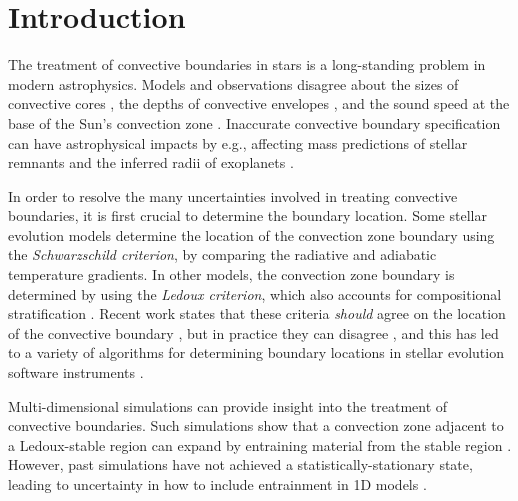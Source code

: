 
\section{Introduction}
\label{sec:introduction}
The treatment of convective boundaries in stars is a long-standing problem in modern astrophysics.
Models and observations disagree about the sizes of convective cores \citep{claret_torres_2018, joyce_chaboyer_2018b, viani_basu_2020, pedersen_etal_2021, johnston_2021}, the depths of convective envelopes \citep[inferred from lithium abundances;][]{pinsonneault_1997, sestito_randich_2005, carlos_etal_2019, dumont_etal_2021}, and the sound speed at the base of the Sun's convection zone \citep[see][Sec.~7.2.1]{basu_2016}.
Inaccurate convective boundary specification can have astrophysical impacts by e.g., affecting mass predictions of stellar remnants \citep{farmer_etal_2019, mehta_etal_2022} and the inferred radii of exoplanets \citep{basu_etal_2012, morrell_2020}.

In order to resolve the many uncertainties involved in treating convective boundaries, it is first crucial to determine the boundary location.
Some stellar evolution models determine the location of the convection zone boundary using the \emph{Schwarzschild criterion}, by comparing the radiative and adiabatic temperature gradients.
In other models, the convection zone boundary is determined by using the \emph{Ledoux criterion}, which also accounts for compositional stratification \citep[][chapter 3, reviews these criteria]{salaris_cassisi_2017}.
Recent work states that these criteria \emph{should} agree on the location of the convective boundary \citep{gabriel_etal_2014, mesa4, mesa5}, but in practice they can disagree \citep[see][chapter 2]{kaiser_etal_2020}, and this has led to a variety of algorithms for determining boundary locations in stellar evolution software instruments \citep{mesa4,mesa5}.

Multi-dimensional simulations can provide insight into the treatment of convective boundaries.
Such simulations show that a convection zone adjacent to a Ledoux-stable region can expand by entraining material from the stable region \citep{meakin_arnett_2007, woodward_etal_2015, jones_etal_2017, cristini_etal_2019, fuentes_cumming_2020, andrassy_etal_2020, andrassy_etal_2021}.
However, past simulations have not achieved a statistically-stationary state, leading to uncertainty in how to include entrainment in 1D models \citep{staritsin_2013, scott_etal_2021}.


